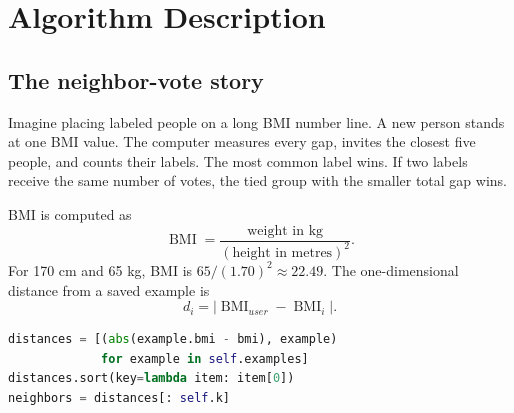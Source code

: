\documentclass[12pt,a4paper,openany]{report}
\newcommand{\sourcepath}[1]{\texttt{#1}}
\begin{document}
\section{Algorithm Description}
\subsection{The neighbor-vote story}
Imagine placing labeled people on a long BMI number line. A new person stands at
one BMI value. The computer measures every gap, invites the closest five people,
and counts their labels. The most common label wins. If two labels receive the
same number of votes, the tied group with the smaller total gap wins.

BMI is computed as
\begin{equation}
\operatorname{BMI}=\frac{\text{weight in kg}}
{(\text{height in metres})^2}.
\end{equation}
For 170 cm and 65 kg, BMI is $65/(1.70)^2\approx22.49$. The one-dimensional
distance from a saved example is
\begin{equation}
d_i=|\operatorname{BMI}_{user}-\operatorname{BMI}_i|.
\end{equation}

\begin{lstlisting}[language=Python,caption={Distance, sorting, and selection in \sourcepath{knn\_model.py}.}]
distances = [(abs(example.bmi - bmi), example)
             for example in self.examples]
distances.sort(key=lambda item: item[0])
neighbors = distances[: self.k]
\end{lstlisting}
\end{document}
